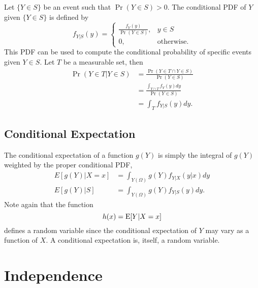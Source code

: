 Let $\{ Y \in S \}$ be an event such that $\Pr (Y \in S) > 0$.
The conditional PDF of $Y$ given $\{ Y \in S \}$ is defined by
\begin{equation*}
f_{Y|S} (y)
= \left\{ \begin{array}{cc} \frac{ f_Y(y) }{\Pr (Y \in S)}, & y \in S \\
0, & \text{otherwise}. \end{array} \right.
\end{equation*}
This PDF can be used to compute the conditional probability of specific events given $Y \in S$.
Let $T$ be a measurable set, then
\begin{equation*}
\begin{split}
\Pr ( Y \in T | Y \in S)
&= \frac{ \Pr ( Y \in T \cap Y \in S) }{ \Pr ( Y \in S) } \\
&= \frac{ \int_{Y \cap T} f_Y(y) dy }{ \Pr ( Y \in S) } \\
&= \int_{T} f_{Y|S} (y) dy .
\end{split}
\end{equation*}


\subsection{Conditional Expectation}

The conditional expectation of a function $g(Y)$ is simply the integral of $g(Y)$ weighted by the proper conditional PDF,
\begin{align*}
E[g(Y) | X = x] &= \int_{Y(\Omega)} g(Y) f_{Y|X} (y|x) dy \\
E[g(Y) | S] &= \int_{Y(\Omega)} g(Y) f_{Y|S} (y) dy .
\end{align*}
Note again that the function
\begin{equation*}
h(x) = \mathrm{E} [Y | X=x]
\end{equation*}
defines a random variable since the conditional expectation of $Y$ may vary as a function of $X$.
A conditional expectation is, itself, a random variable.




\section{Independence}


